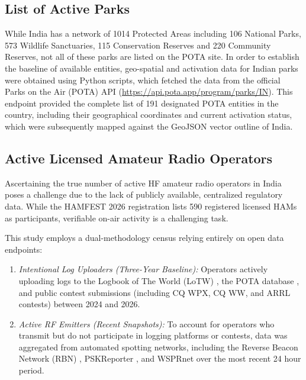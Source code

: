\documentclass[conference]{IEEEtran}
\begin{document}
\subsection{List of Active Parks}
While India has a network of 1014 Protected Areas including 106
National Parks, 573 Wildlife Sanctuaries, 115 Conservation Reserves
and 220 Community Reserves\cite{b10}, not all of these parks are
listed on the POTA site. In order to establish the baseline of
available entities, geo-spatial and activation data for Indian parks
were obtained using Python scripts, which fetched the data from the
official Parks on the Air (POTA) API
(\url{https://api.pota.app/program/parks/IN}). This endpoint provided
the complete list of 191 designated POTA entities in the country,
including their geographical coordinates and current activation
status, which were subsequently mapped against the GeoJSON vector
outline of India.

\subsection{Active Licensed Amateur Radio Operators}
Ascertaining the true number of active HF amateur radio operators in
India poses a challenge due to the lack of publicly available,
centralized regulatory data. While the HAMFEST 2026 registration lists
590 registered licensed HAMs\cite{b2} as participants, verifiable
on-air activity is a challenging task.

This study employs a dual-methodology census relying entirely on open
data endpoints:
\begin{enumerate}
    \item \textit{Intentional Log Uploaders (Three-Year Baseline):}
      Operators actively uploading logs to the Logbook of The World
      (LoTW) \cite{b4}, the POTA database \cite{b3}, and public
      contest submissions (including CQ WPX, CQ WW, and ARRL contests)
      \cite{b5} between 2024 and 2026.
    \item \textit{Active RF Emitters (Recent Snapshots):} To account
      for operators who transmit but do not participate in logging
      platforms or contests, data was aggregated from automated
      spotting networks, including the Reverse Beacon Network (RBN)
      \cite{b6}, PSKReporter \cite{b11}, and WSPRnet \cite{b12} over
      the most recent 24 hour period.
    \end{enumerate}
\end{document}
